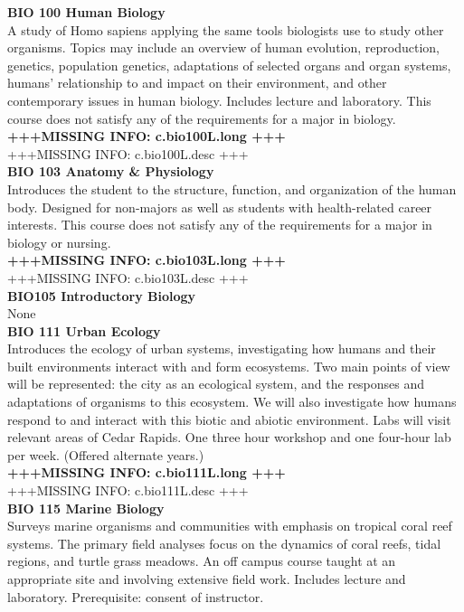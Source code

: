 \documentclass[
  letterpaper,
]{scrbook}
\begin{document}
\textbf{BIO 100 Human Biology}\\
A study of Homo sapiens applying the same tools biologists use to study
other organisms. Topics may include an overview of human evolution,
reproduction, genetics, population genetics, adaptations of selected
organs and organ systems, humans' relationship to and impact on their
environment, and other contemporary issues in human biology. Includes
lecture and laboratory. This course does not satisfy any of the
requirements for a major in biology.\\
\textbf{+++MISSING INFO: c.bio100L.long +++}\\
+++MISSING INFO: c.bio100L.desc +++\\
\textbf{BIO 103 Anatomy \& Physiology}\\
Introduces the student to the structure, function, and organization of
the human body. Designed for non-majors as well as students with
health-related career interests. This course does not satisfy any of the
requirements for a major in biology or nursing.\\
\textbf{+++MISSING INFO: c.bio103L.long +++}\\
+++MISSING INFO: c.bio103L.desc +++\\
\textbf{BIO105 Introductory Biology}\\
None\\
\textbf{BIO 111 Urban Ecology}\\
Introduces the ecology of urban systems, investigating how humans and
their built environments interact with and form ecosystems. Two main
points of view will be represented: the city as an ecological system,
and the responses and adaptations of organisms to this ecosystem. We
will also investigate how humans respond to and interact with this
biotic and abiotic environment. Labs will visit relevant areas of Cedar
Rapids. One three hour workshop and one four-hour lab per week. (Offered
alternate years.)\\
\textbf{+++MISSING INFO: c.bio111L.long +++}\\
+++MISSING INFO: c.bio111L.desc +++\\
\textbf{BIO 115 Marine Biology}\\
Surveys marine organisms and communities with emphasis on tropical coral
reef systems. The primary field analyses focus on the dynamics of coral
reefs, tidal regions, and turtle grass meadows. An off campus course
taught at an appropriate site and involving extensive field work.
Includes lecture and laboratory. Prerequisite: consent of instructor.
\end{document}
